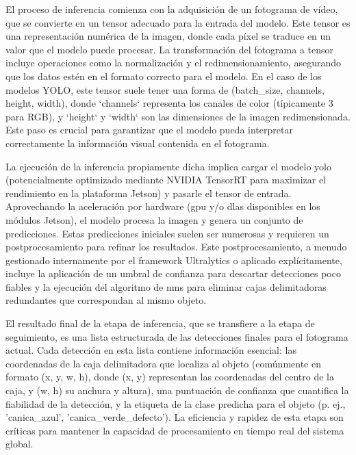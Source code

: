 \documentclass[11pt,spanish,listoffigures,listoftables]{tfgetsinf}
\begin{document}
El proceso de inferencia comienza con la adquisición de un fotograma de vídeo, que se convierte en un tensor adecuado para la entrada del modelo. Este tensor es una representación numérica de la imagen, donde cada píxel se traduce en un valor que el modelo puede procesar. La transformación del fotograma a tensor incluye operaciones como la normalización y el redimensionamiento, asegurando que los datos estén en el formato correcto para el modelo. En el caso de los modelos YOLO, este tensor suele tener una forma de (batch\_size, channels, height, width), donde `channels` representa los canales de color (típicamente 3 para RGB), y `height` y `width` son las dimensiones de la imagen redimensionada. Este paso es crucial para garantizar que el modelo pueda interpretar correctamente la información visual contenida en el fotograma.

La ejecución de la inferencia propiamente dicha implica cargar el modelo \gls{yolo} (potencialmente optimizado mediante NVIDIA TensorRT para maximizar el rendimiento en la plataforma Jetson) y pasarle el tensor de entrada. Aprovechando la aceleración por hardware (\gls{gpu} y/o \gls{dla}s disponibles en los módulos Jetson), el modelo procesa la imagen y genera un conjunto de predicciones. Estas predicciones iniciales suelen ser numerosas y requieren un postprocesamiento para refinar los resultados. Este postprocesamiento, a menudo gestionado internamente por el framework Ultralytics o aplicado explícitamente, incluye la aplicación de un umbral de confianza para descartar detecciones poco fiables y la ejecución del algoritmo de \gls{nms} para eliminar cajas delimitadoras redundantes que correspondan al mismo objeto.

El resultado final de la etapa de inferencia, que se transfiere a la etapa de seguimiento, es una lista estructurada de las detecciones finales para el fotograma actual. Cada detección en esta lista contiene información esencial: las coordenadas de la caja delimitadora que localiza al objeto (comúnmente en formato (x, y, w, h), donde (x, y) representan las coordenadas del centro de la caja, y (w, h) su anchura y altura), una puntuación de confianza que cuantifica la fiabilidad de la detección, y la etiqueta de la clase predicha para el objeto (p. ej., 'canica\_azul', 'canica\_verde\_defecto'). La eficiencia y rapidez de esta etapa son críticas para mantener la capacidad de procesamiento en tiempo real del sistema global.
\end{document}
